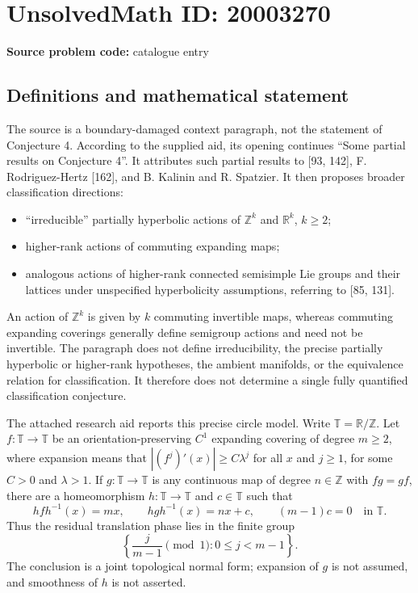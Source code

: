 \documentclass[11pt]{article}
\newcommand{\Z}{\mathbb{Z}}
\newcommand{\R}{\mathbb{R}}
\begin{document}
\section*{UnsolvedMath ID: 20003270}
\textbf{Source problem code:} catalogue entry
\subsection{Definitions and mathematical statement}
The source is a boundary-damaged context paragraph, not the statement of Conjecture 4. According to the supplied aid, its opening continues ``Some partial results on Conjecture 4''. It attributes such partial results to [93, 142], F. Rodriguez-Hertz [162], and B. Kalinin and R. Spatzier. It then proposes broader classification directions:
\begin{itemize}
\item ``irreducible'' partially hyperbolic actions of $\Z^k$ and $\R^k$, $k\ge2$;
\item higher-rank actions of commuting expanding maps;
\item analogous actions of higher-rank connected semisimple Lie groups and their lattices under unspecified hyperbolicity assumptions, referring to [85, 131].
\end{itemize}
An action of $\Z^k$ is given by $k$ commuting invertible maps, whereas commuting expanding coverings generally define semigroup actions and need not be invertible. The paragraph does not define irreducibility, the precise partially hyperbolic or higher-rank hypotheses, the ambient manifolds, or the equivalence relation for classification. It therefore does not determine a single fully quantified classification conjecture.

The attached research aid reports this precise circle model. Write $\mathbb T=\R/\Z$. Let $f:\mathbb T\to\mathbb T$ be an orientation-preserving $C^1$ expanding covering of degree $m\ge2$, where expansion means that $|(f^j)'(x)|\ge C\lambda^j$ for all $x$ and $j\ge1$, for some $C>0$ and $\lambda>1$. If $g:\mathbb T\to\mathbb T$ is any continuous map of degree $n\in\Z$ with $fg=gf$, there are a homeomorphism $h:\mathbb T\to\mathbb T$ and $c\in\mathbb T$ such that
\[
 hfh^{-1}(x)=mx,\qquad hgh^{-1}(x)=nx+c,
 \qquad (m-1)c=0\quad\text{in }\mathbb T.
\]
Thus the residual translation phase lies in the finite group
\[
 \left\{\frac{j}{m-1}\pmod1:0\le j<m-1\right\}.
\]
The conclusion is a joint topological normal form; expansion of $g$ is not assumed, and smoothness of $h$ is not asserted.
\end{document}
